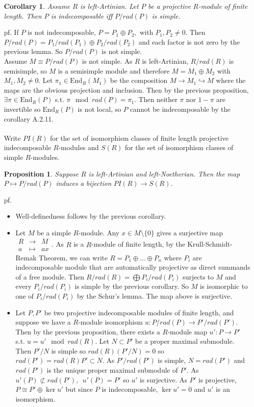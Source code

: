 \documentclass[12pt,letterpaper]{report}
\newtheorem{proposition}{Proposition}[section]
\newtheorem{corollary}{Corollary}[section]
\begin{document}
\begin{corollary}Assume $R$ is left-Artinian. Let $P$ be a projective $R$-module of finite length. Then $P$ is indecomposable iff $P/rad(P)$ is simple.\end{corollary}
pf. If $P$ is not indecomposable, $P=P_{1}\oplus P_{2},$ with $P_{1},P_{2}\neq0$. Then $P/rad(P)=P_{1}/rad(P_{1})\oplus P_{2}/rad(P_{2})$ and each factor is not zero by the previous lemma. So $P/rad(P)$ is not simple. 
\\Assume $M\equiv P/rad(P)$ is not simple. As $R$ is left-Artinian, $R/rad(R)$ is semisimple, so $M$ is a semisimple module and therefore $M=M_{1}\oplus M_{2}$ with $M_{1},M_{2}\neq0$. Let $\pi_{1}\in\text{End}_{R}(M_{1})$ be the composition $M\rightarrow M_{1}\hookrightarrow M$ where the maps are the obvious projection and inclusion. Then by the previous proposition, $\exists \pi\in \text{End}_{R}(P)$ s.t. $\pi\mod rad(P)=\pi_{1}$. Then neither $\pi$ nor $1-\pi$ are invertible so $\text{End}_{R}(P)$ is not local, so $P$ cannot be indecomposable by the corollary A.2.11.
\\\\\indent Write $PI(R)$ for the set of isomorphism classes of finite length projective indecomposable $R$-modules and $S(R)$ for the set of isomorphism classes of simple $R$-modules.
\begin{proposition}Suppose $R$ is left-Artinian and left-Noetherian. Then the map $P\mapsto P/rad(P)$ induces a bijection $PI(R)\rightarrow S(R)$.\end{proposition}
pf. \begin{itemize}\item Well-definedness follows by the previous corollary. 
\item Let $M$ be a simple $R$-module. Any $x\in M\setminus\{0\}$ gives a surjective map $\begin{array}{rrr}R&\rightarrow&M\\a&\mapsto&ax\end{array}$. As $R$ is a $R$-module of finite length, by the Krull-Schmidt-Remak Theorem, we can write $R=P_{1}\oplus\dots\oplus P_{n}$ where $P_{i}$ are indecomposable module that are automatically projective as direct summands of a free module. Then $R/rad(R)=\bigoplus P_{i}/rad(P_{i})$ surjects to $M$ and every $P_{i}/rad(P_{i})$ is simple by the previous corollary. So $M$ is isomorphic to one of $P_{i}/rad(P_{i})$ by the Schur's lemma. The map above is surjective.
\item Let $P,P'$ be two projective indecomposable modules of finite length, and suppose we have a $R$-module isomorphism $u:P/rad(P)\rightarrow P'/rad( P')$. Then by the previous proposition, there exists a $R$-module map $u':P\rightarrow P'$ s.t. $u=u'\mod rad(R)$. Let $N\subset P'$ be a proper maximal submodule. Then $P'/N$ is simple so $rad(R)(P'/N)=0$ so $rad(P')=rad(R)P'\subset N$. As $P'/rad(P')$ is simple, $N=rad(P')$ and $rad(P')$ is the unique proper maximal submodule of $P'$. As $u'(P)\not\subset rad(P'),\,\,\,u'(P)=P'$ so $u'$ is surjective. As $P'$ is projective, $P\cong P'\oplus\ker u'$ but since $P$ is indecomposable, $\ker u'=0$ and $u'$ is an isomorphism.

\end{itemize}
\end{document}
